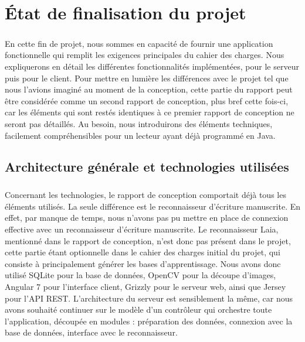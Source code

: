 \chapter{État de finalisation du projet}

\paragraph{}
En cette fin de projet, nous sommes en capacité de fournir une application fonctionnelle qui remplit les exigences principales du cahier des charges. Nous expliquerons en détail les différentes fonctionnalités implémentées, pour le serveur puis pour le client. Pour mettre en lumière les différences avec le projet tel que nous l'avions imaginé au moment de la conception, cette partie du rapport peut être considérée comme un second rapport de conception, plus bref cette fois-ci, car les éléments qui sont restés identiques à ce premier rapport de conception ne seront pas détaillés. Au besoin, nous introduirons des éléments techniques, facilement compréhensibles pour un lecteur ayant déjà programmé en Java.

\section{Architecture générale et technologies utilisées}

\paragraph{}
Concernant les technologies, le rapport de conception comportait déjà tous les éléments utilisés. La seule différence est le reconnaisseur d'écriture manuscrite. En effet, par manque de temps, nous n'avons pas pu mettre en place de connexion effective avec un reconnaisseur d'écriture manuscrite. Le reconnaisseur Laia, mentionné dans le rapport de conception, n'est donc pas présent dans le projet, cette partie étant optionnelle dans le cahier des charges initial du projet, qui consiste à principalement générer les bases d'apprentissage. Nous avons donc utilisé SQLite pour la base de données, OpenCV pour la découpe d'images, Angular 7 pour l'interface client, Grizzly pour le serveur web, ainsi que Jersey pour l'API REST. L'architecture du serveur est sensiblement la même, car nous avons souhaité continuer sur le modèle d'un contrôleur qui orchestre toute l'application, découpée en modules : préparation des données, connexion avec la base de données, interface avec le reconnaisseur.

